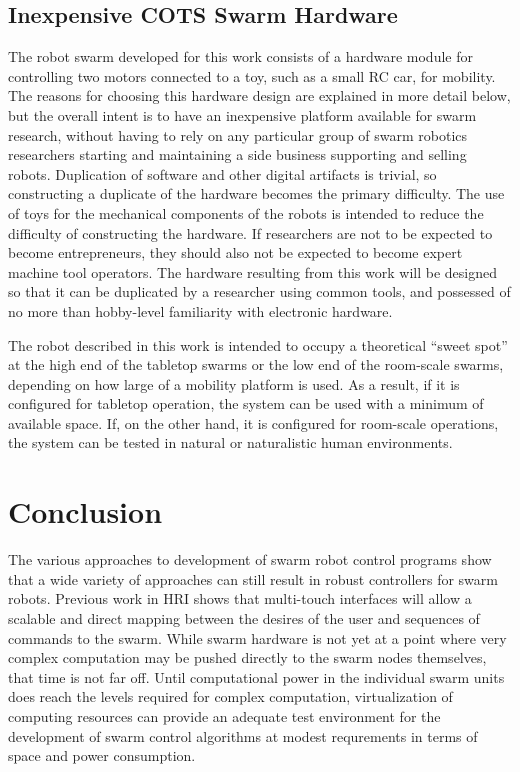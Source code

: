 \documentclass[]{article}
\begin{document}
\subsection{Inexpensive COTS Swarm Hardware}
The robot swarm developed for this work consists of a hardware module for controlling two motors connected to a toy, such as a small RC car, for mobility. 
The reasons for choosing this hardware design are explained in more detail below, but the overall intent is to have an inexpensive platform available for swarm research, without having to rely on any particular group of swarm robotics researchers starting and maintaining a side business supporting and selling robots.
Duplication of software and other digital artifacts is trivial, so constructing a duplicate of the hardware becomes the primary difficulty. 
The use of toys for the mechanical components of the robots is intended to reduce the difficulty of constructing the hardware. 
If researchers are not to be expected to become entrepreneurs, they should also not be expected to become expert machine tool operators.
The hardware resulting from this work will be designed so that it can be duplicated by a researcher using common tools, and possessed of no more than hobby-level familiarity with electronic hardware.

The robot described in this work is intended to occupy a theoretical ``sweet spot'' at the high end of the tabletop swarms or the low end of the room-scale swarms, depending on how large of a mobility platform is used. 
As a result, if it is configured for tabletop operation, the system can be used with a minimum of available space. 
If, on the other hand, it is configured for room-scale operations, the system can be tested in natural or naturalistic human environments. 

\section{Conclusion}

The various approaches to development of swarm robot control programs show that a wide variety of approaches can still result in robust controllers for swarm robots. 
Previous work in HRI shows that multi-touch interfaces will allow a scalable and direct mapping between the desires of the user and sequences of commands to the swarm. 
While swarm hardware is not yet at a point where very complex computation may be pushed directly to the swarm nodes themselves, that time is not far off. 
Until computational power in the individual swarm units does reach the levels required for complex computation, virtualization of computing resources can provide an adequate test environment for the development of swarm control algorithms at modest requrements in terms of space and power consumption. 



\end{document}
